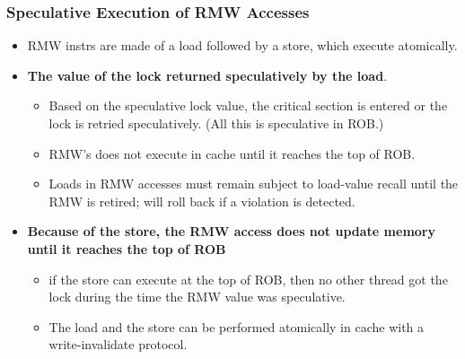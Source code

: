 \documentclass{beamer}
\newcommand{\emphh}[1]{\textcolor{CosGreen}{ #1}}
\begin{document}
\begin{frame}[fragile,t]
\frametitle{Speculative Execution of RMW Accesses}

\begin{itemize}
\item RMW instrs are made of a load followed by a store, which execute atomically.\bigskip

\item \emphh{\bf The value of the lock returned speculatively by the load}.
    \begin{itemize}
        \item Based on the speculative lock value, the critical section
                is entered or the lock is retried speculatively.
        (All this is speculative in ROB.)
        \item RMW's does not execute in cache until it reaches
               the top of ROB.
        \item Loads in RMW accesses must remain subject to load-value recall
                until the RMW is retired;
        will roll back if a violation is detected. 
    \end{itemize}\medskip


\item \emphh{\bf Because of the store, the RMW access does not update
                memory until it reaches the top of ROB}
    \begin{itemize}
        \item if the store can execute at the top of ROB, then
                no other thread got the lock during the time the RMW value
                was speculative.
        \item The load and the store can be performed atomically in
                cache with a write-invalidate protocol.
    \end{itemize}\medskip
\end{itemize}

\end{frame}
\end{document}
